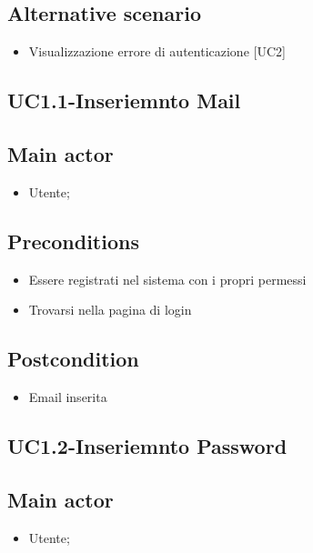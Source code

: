 \documentclass{article}
\begin{document}
        \subsection*{Alternative scenario}
            \begin{itemize}
                \item Visualizzazione errore di autenticazione [UC2]
            \end{itemize}
            
\subsection{UC1.1-Inseriemnto Mail}
    
     \subsection*{Main actor}
         \begin{itemize}
             \item Utente;
         \end{itemize}
     \subsection*{Preconditions} 
        \begin{itemize}
            \item Essere registrati nel sistema con i propri permessi
            \item Trovarsi nella pagina di login
        \end{itemize}
        \subsection*{Postcondition} 
        \begin{itemize}
            \item Email inserita
        \end{itemize}

\subsection{UC1.2-Inseriemnto Password}
    
     \subsection*{Main actor}
         \begin{itemize}
             \item Utente;
         \end{itemize}
\end{document}
